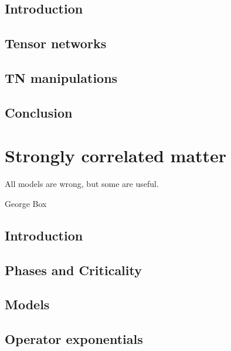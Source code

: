\documentclass{book}
\newcounter{a}
\newcounter{b}
\begin{document}
\section{Introduction}


\section{Tensor networks}


\section{TN manipulations}\label{sec:mpomath}




\section{Conclusion}


\chapter{Strongly correlated matter}\label{chap3}

\epigraph{All models are wrong, but some are useful.}{George Box}

\section{Introduction}


\section{Phases and Criticality} \label{sec:PhasesAndCrit}


\section{Models}


\section{Operator exponentials}

\end{document}
